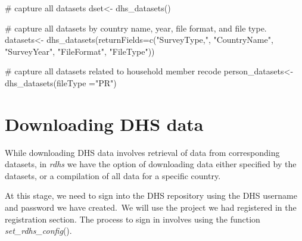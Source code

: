 \documentclass[
  letterpaper,
  DIV=11,
  numbers=noendperiod]{scrreprt}
\newenvironment{Shaded}{\begin{snugshade}}{\end{snugshade}}
\newcommand{\AttributeTok}[1]{\textcolor[rgb]{0.40,0.45,0.13}{#1}}
\newcommand{\CommentTok}[1]{\textcolor[rgb]{0.37,0.37,0.37}{#1}}
\newcommand{\FunctionTok}[1]{\textcolor[rgb]{0.28,0.35,0.67}{#1}}
\newcommand{\NormalTok}[1]{\textcolor[rgb]{0.00,0.23,0.31}{#1}}
\newcommand{\OtherTok}[1]{\textcolor[rgb]{0.00,0.23,0.31}{#1}}
\newcommand{\StringTok}[1]{\textcolor[rgb]{0.13,0.47,0.30}{#1}}
\begin{document}
\begin{Shaded}
\begin{Highlighting}[]
\CommentTok{\# capture all datasets}
\NormalTok{dset}\OtherTok{\textless{}{-}} \FunctionTok{dhs\_datasets}\NormalTok{()}

\CommentTok{\# capture all datasets by country name, year, file format, and file type. }
\NormalTok{datasets}\OtherTok{\textless{}{-}} \FunctionTok{dhs\_datasets}\NormalTok{(}\AttributeTok{returnFields=}\FunctionTok{c}\NormalTok{(}\StringTok{"SurveyType,"}\NormalTok{, }\StringTok{"CountryName"}\NormalTok{, }\StringTok{"SurveyYear"}\NormalTok{, }\StringTok{"FileFormat"}\NormalTok{, }\StringTok{"FileType"}\NormalTok{))}

\CommentTok{\# capture all datasets related to household member recode}
\NormalTok{person\_datasets}\OtherTok{\textless{}{-}} \FunctionTok{dhs\_datasets}\NormalTok{(}\AttributeTok{fileType =}\StringTok{"PR"}\NormalTok{)}
\end{Highlighting}
\end{Shaded}


\chapter{Downloading DHS data}\label{downloading-dhs-data}

While downloading DHS data involves retrieval of data from corresponding
datasets, in \emph{rdhs} we have the option of downloading data either
specified by the datasets, or a compilation of all data for a specific
country.

At this stage, we need to sign into the DHS repository using the DHS
username and password we have created.~We will use the project we had
registered in the registration section. The process to sign in involves
using the function \emph{set\_rdhs\_config}().
\end{document}
